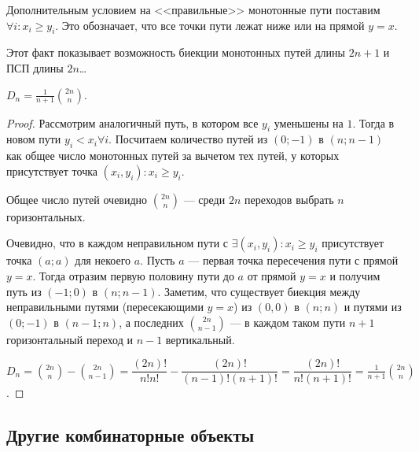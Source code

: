 \documentclass[a4paper]{report}
\begin{document}
    Дополнительным условием на <<правильные>> монотонные пути поставим $\forall i:x_i \ge y_i$.
    Это обозначает, что все точки пути лежат ниже или на прямой $y = x$.


    Этот факт показывает возможность биекции монотонных путей длины $2n + 1$ и ПСП длины $2n$\ldots

     $D_n = \frac{1}{n+1}\binom{2n}{n}$.
    \begin{proof}
        Рассмотрим аналогичный путь, в котором все $y_i$ уменьшены на $1$.
        Тогда в новом пути $y_i < x_i \forall i$.
        Посчитаем количество путей из $(0; -1)$ в $(n; n - 1)$ как общее число монотонных путей за вычетом тех путей, у которых присутствует точка $(x_i, y_i) : x_i \ge y_i$.

        Общее число путей очевидно $\binom{2n}{n}$ --- среди $2n$ переходов выбрать $n$ горизонтальных.

        Очевидно, что в каждом неправильном пути с $\exists (x_i, y_i) : x_i \ge y_i$ присутствует точка $(a; a)$ для некоего $a$.
        Пусть $a$ --- первая точка пересечения пути с прямой $y = x$.
        Тогда отразим первую половину пути до $a$ от прямой $y = x$ и получим путь из $(-1; 0)$ в $(n; n - 1)$.
        Заметим, что существует биекция между неправильными путями (пересекающими $y = x$) из $(0, 0)$ в $(n; n)$ и путями из $(0; -1)$ в $(n-1;n)$, а последних $\binom{2n}{n-1}$ --- в каждом таком пути $n + 1$ горизонтальный переход и $n - 1$ вертикальный. 

        $D_n = \binom{2n}{n} - \binom{2n}{n-1} = \dfrac{(2n)!}{n!n!}-\dfrac{(2n)!}{(n-1)!(n+1)!} = \dfrac{(2n)!}{n!(n+1)!} = \frac{1}{n+1}\binom{2n}{n}$.
    \end{proof}


    \subsection{Другие комбинаторные объекты}
\end{document}
